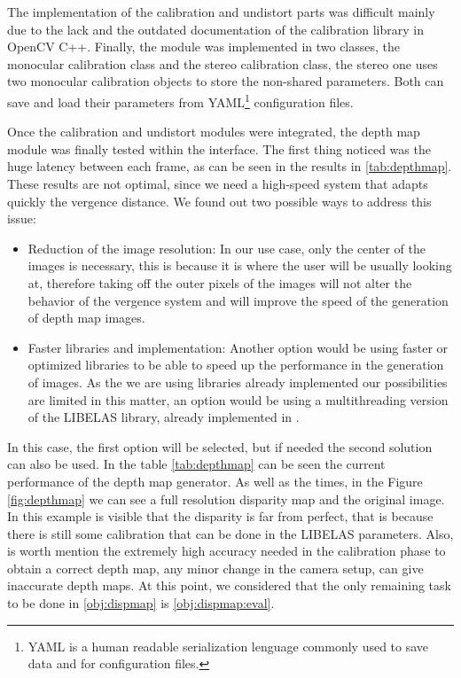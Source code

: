 \documentclass[10pt,a4paper,twocolumn,twoside]{article}
\begin{document}
	The implementation of the calibration and undistort parts was difficult mainly due to the lack and the outdated documentation of the calibration library in OpenCV C++. Finally, the module was implemented in two classes, the monocular calibration class and the stereo calibration class, the stereo one uses two monocular calibration objects to store the non-shared parameters. Both can save and load their parameters from YAML\footnote{YAML is a human readable serialization lenguage commonly used to save data and for configuration files.} configuration files.
	
	Once the calibration and undistort modules were integrated, the depth map module was finally tested within the interface. 
	The first thing noticed was the huge latency between each frame, as can be seen in the results in \ref{tab:depthmap}. These results are not optimal, since we need a high-speed system that adapts quickly the vergence distance. We found out two possible ways to address this issue:
	
	\begin{itemize}
		\item Reduction of the image resolution: In our use case, only the center of the images is necessary, this is because it is where the user will be usually looking at, therefore taking off the outer pixels of the images will not alter the behavior of the vergence system and will improve the speed of the generation of depth map images.
		
		\item Faster libraries and implementation: Another option would be using faster or optimized libraries to be able to speed up the performance in the generation of images. As the we are using libraries already implemented our possibilities are limited in this matter, an option would be using a multithreading version of the LIBELAS library, already implemented in \cite{web:LIBELAS}.
	\end{itemize}
	In this case, the first option will be selected, but if needed the second solution can also be used. In the table \ref{tab:depthmap} can be seen the current performance of the depth map generator. As well as the times, in the Figure \ref{fig:depthmap} we can see a full resolution disparity map and the original image. In this example is visible that the disparity is far from perfect, that is because there is still some calibration that can be done in the LIBELAS parameters. Also, is worth mention the extremely high accuracy needed in the calibration phase to obtain a correct depth map, any minor change in the camera setup, can give inaccurate depth maps.
	At this point, we considered that the only remaining task to be done in \ref{obj:dispmap} is \ref{obj:dispmap:eval}.
	
\end{document}
